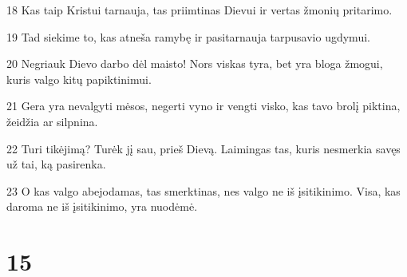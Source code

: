 \par 18 Kas taip Kristui tarnauja, tas priimtinas Dievui ir vertas žmonių pritarimo. 
\par 19 Tad siekime to, kas atneša ramybę ir pasitarnauja tarpusavio ugdymui. 
\par 20 Negriauk Dievo darbo dėl maisto! Nors viskas tyra, bet yra bloga žmogui, kuris valgo kitų papiktinimui. 
\par 21 Gera yra nevalgyti mėsos, negerti vyno ir vengti visko, kas tavo brolį piktina, žeidžia ar silpnina. 
\par 22 Turi tikėjimą? Turėk jį sau, prieš Dievą. Laimingas tas, kuris nesmerkia savęs už tai, ką pasirenka. 
\par 23 O kas valgo abejodamas, tas smerktinas, nes valgo ne iš įsitikinimo. Visa, kas daroma ne iš įsitikinimo, yra nuodėmė.


\chapter{15}



